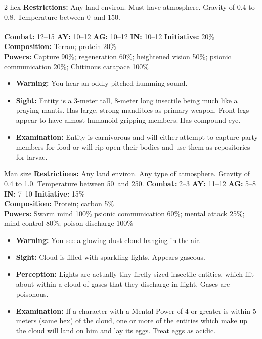 \hrulefill

\begin{creature}{2 hex}
\textbf{Restrictions:} Any land environ. Must have atmosphere. Gravity of 0.4 to 0.8. Temperature between 0\textdegree\ and 150\textdegree. \\\\
\textbf{Combat:} 12--15 \textbf{AY:} 10--12 \textbf{AG:} 10--12 \textbf{IN:} 10--12 \textbf{Initiative:} 20\% \\
\textbf{Composition:} Terran; protein 20\% \\
\textbf{Powers:} Capture 90\%; regeneration 60\%; heightened vision 50\%; psionic communication 20\%; Chitinous carapace 100\% 
\begin{itemize}
\item \textbf{Warning:} You hear an oddly pitched humming sound. 
\item \textbf{Sight:} Entity is a 3-meter tall, 8-meter long insectile being much like a praying mantis. Has large, strong mandibles as primary 
weapon. Front legs appear to have almost humanoid gripping members. Has compound eye. 
\item \textbf{Examination:} Entity is carnivorous and will either attempt to capture party members for food or will rip open their bodies and use 
them as repositories for larvae. 
\end{itemize}
\end{creature}

\hrulefill

\begin{creature}{Man size}
\textbf{Restrictions:} Any land environ. Any type of atmosphere. Gravity of 0.4 to 1.0. Temperature between 50\textdegree\ and 250\textdegree. \textbf{Combat:} 2--3 \textbf{AY:} 
11--12 \textbf{AG:} 5--8 \textbf{IN:} 7--10 \textbf{Initiative:} 15\% \\
\textbf{Composition:} Protein; carbon 5\% \\
\textbf{Powers:} Swarm mind 100\% psionic communication 60\%; mental attack 25\%; mind control 80\%; poison discharge 100\% 
\begin{itemize}
\item \textbf{Warning:} You see a glowing dust cloud hanging in the air. 
\item \textbf{Sight:} Cloud is filled with sparkling lights. Appears gaseous. 
\item \textbf{Perception:} Lights are actually tiny firefly sized insectile entities, which flit about within a cloud of gases that they discharge in flight. 
Gases are poisonous. 
\item \textbf{Examination:} If a character with a Mental Power of 4 or greater is within 5 meters (same hex) of the cloud, one or more of the entities 
which make up the cloud will land on him and lay its eggs. Treat eggs as acidic. 

\end{itemize}
\end{creature}

